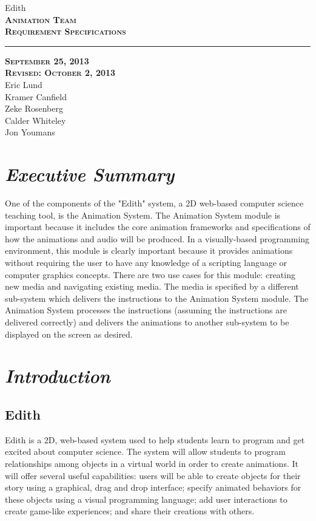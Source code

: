 \documentclass[12pt]{article}
\begin{document}
\begin{titlepage}
	\begin{center}
	\huge  Edith \\
	\vspace*{\fill}%
 	\huge \textsc{\textbf{Animation Team \\Requirement Specifications} }	
	\bigskip 
	\rule{130mm}{.1pt}
	\textsc{\textbf{September 25, 2013 \\ Revised: October 2, 2013} \\ }	
	\vspace*{\fill}%
	Eric Lund \\
	Kramer Canfield \\ 
	Zeke Rosenberg \\
	Calder Whiteley \\
	Jon Youmans
	\end{center}
	\end{titlepage}


\section{\emph{Executive Summary}}
One of the components of the "Edith" system, a 2D web-based computer science teaching tool, is the Animation System. The Animation System module is important because it includes the core animation frameworks and specifications of how the animations and audio will be produced. In a visually-based programming environment, this module is clearly important because it provides animations without requiring the user to have any knowledge of a scripting language or computer graphics concepts. There are two use cases for this module: creating new media and navigating existing media. The media is specified by a different sub-system which delivers the instructions to the Animation System module. The Animation System processes the instructions (assuming the instructions are delivered correctly) and delivers the animations to another sub-system to be displayed on the screen as desired.


\section{\emph{Introduction}}%
	\subsection{Edith}
         Edith is a 2D, web-based system used to help students learn to program and get excited about computer science. The system will allow students to program relationships among objects in a virtual world in order to create animations. It will offer several useful capabilities: users will be able to create objects for their story using a graphical, drag and drop interface; specify animated behaviors for these objects using a visual programming language; add user interactions to create game-like experiences; and share their creations with others. 
\end{document}
